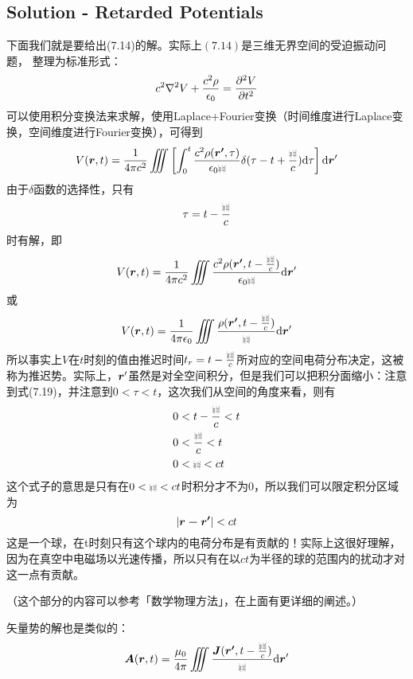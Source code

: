 \documentclass[14pt,oneside]{book}
\def\rr{{\mbox{$\resizebox{.09in}{.08in}{\texttt{[image: ScriptR]}}$}}}
\def \J{\vb*{J}}
\def \A{\vb*{A}}
\def \laplace{\nabla^2{}}
\begin{document}
\begin{large}
\subsection{Solution - Retarded Potentials}
下面我们就是要给出(7.14)的解。实际上$(7.14)$是三维无界空间的受迫振动问题，
整理为标准形式：
\begin{equation}
 c^2\laplace V+\frac{c^2\rho}{\epsilon_0}=\pdv[2]{V}{t}
\end{equation}
可以使用积分变换法来求解，使用Laplace+Fourier变换（时间维度进行Laplace变换，空间维度进行Fourier变换），可得到
\begin{equation}
  V(\vb*{r},t)=\frac{1}{4\pi c^2}\iiint\left[\int_0^t\frac{c^2\rho(\vb*{r'},\tau)}{\epsilon_0 \rr}\delta(\tau-t+\frac{\rr}{c})\dd \tau\right]\dd \vb*{r}'
\end{equation}
由于$\delta$函数的选择性，只有
\begin{equation}
  \tau=t-\frac{\rr}{c}
\end{equation}
时有解，即
\begin{equation}
  V(\vb*{r},t)=\frac{1}{4\pi c^2}\iiint\frac{c^2\rho(\vb*{r'},t-\frac{\rr}{c})}{\epsilon_0 \rr}\dd \vb*{r}'
\end{equation}
或
\begin{equation}
    V(\vb*{r},t)=\frac{1}{4\pi\epsilon_0}\iiint\frac{\rho(\vb*{r'},t-\frac{\rr}{c})}{ \rr}\dd \vb*{r}'
\end{equation}
所以事实上$V$在$t$时刻的值由推迟时间$t_r=t-\frac{\rr}{c}$所对应的空间电荷分布决定，这被称为推迟势。实际上，$\vb*{r}'$虽然是对全空间积分，但是我们可以把积分面缩小：注意到式(7.19)，并注意到$0<\tau<t$，这次我们从空间的角度来看，则有
\begin{equation}
\begin{aligned}
	  0&<t-\frac{\rr}{c}<t\\
	  0&<\frac{\rr}{c}<t\\
	  0&<\rr<ct
\end{aligned}
\end{equation}
这个式子的意思是只有在$0<\rr<ct$时积分才不为0，所以我们可以限定积分区域为
\begin{equation}
  \abs{\vb*{r-r'}}<ct
\end{equation}
这是一个球，在t时刻只有这个球内的电荷分布是有贡献的！实际上这很好理解，因为在真空中电磁场以光速传播，所以只有在以$ct$为半径的球的范围内的扰动才对这一点有贡献。

（这个部分的内容可以参考「数学物理方法」，在上面有更详细的阐述。）

矢量势的解也是类似的：
\begin{equation}
  \A(\vb*{r},t)=\frac{\mu_0}{4\pi}\iiint\frac{\J(\vb*{r'},t-\frac{\rr}{c})}{ \rr}\dd \vb*{r}'
\end{equation}


\end{large}
\end{document}
